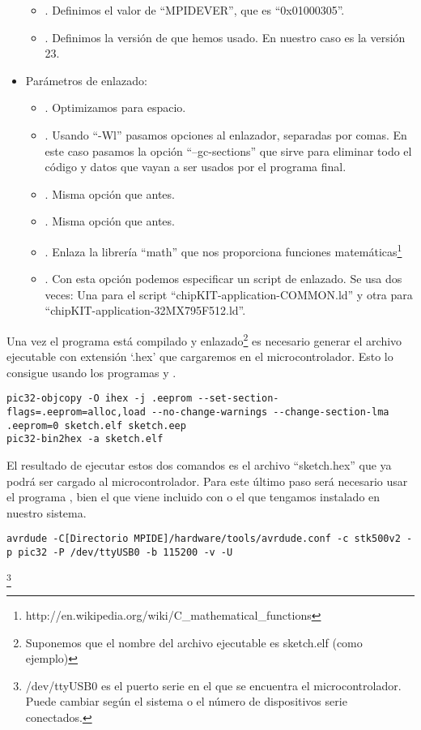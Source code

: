 \begin{itemize}
\begin{itemize}
		\item {}. Definimos el valor de ``MPIDEVER'', que es ``0x01000305''.
		\item {}. Definimos la versión de  que hemos usado. En nuestro caso es la versión 23.
	\end{itemize}
	\item Parámetros de enlazado:
		\begin{itemize}
			\item {}. Optimizamos para espacio.
			\item {}. Usando ``-Wl'' pasamos opciones al enlazador, separadas por comas. En este caso pasamos la opción ``--gc-sections'' que sirve para eliminar todo el código y datos que vayan a ser usados por el programa final.
			\item {}. Misma opción que antes.
			\item {}. Misma opción que antes.
			\item {}. Enlaza la librería ``math'' que nos proporciona funciones matemáticas\protect\footnote{http://en.wikipedia.org/wiki/C\_mathematical\_functions}
			\item {}. Con esta opción podemos especificar un script de enlazado. Se usa dos veces: Una para el script ``chipKIT-application-COMMON.ld'' y otra para ``chipKIT-application-32MX795F512.ld''.
		\end{itemize}
\end{itemize}

Una vez el programa está compilado y enlazado\protect\footnote{Suponemos que el nombre del archivo ejecutable es sketch.elf (como ejemplo)} es necesario generar el archivo ejecutable con extensión `.hex' que cargaremos en el microcontrolador. Esto lo consigue  usando los programas  y .
\begin{lstlisting}[breaklines=true]
pic32-objcopy -O ihex -j .eeprom --set-section-flags=.eeprom=alloc,load --no-change-warnings --change-section-lma .eeprom=0 sketch.elf sketch.eep
pic32-bin2hex -a sketch.elf
\end{lstlisting}

El resultado de ejecutar estos dos comandos es el archivo ``sketch.hex'' que ya podrá ser cargado al microcontrolador.
Para este último paso será necesario usar el programa , bien el que viene incluido con  o el que tengamos instalado en nuestro sistema.
\begin{lstlisting}[breaklines=true]
avrdude -C[Directorio MPIDE]/hardware/tools/avrdude.conf -c stk500v2 -p pic32 -P /dev/ttyUSB0 -b 115200 -v -U
\end{lstlisting}\protect\footnote{/dev/ttyUSB0 es el puerto serie en el que se encuentra el microcontrolador. Puede cambiar según el sistema o el número de dispositivos serie conectados.}

